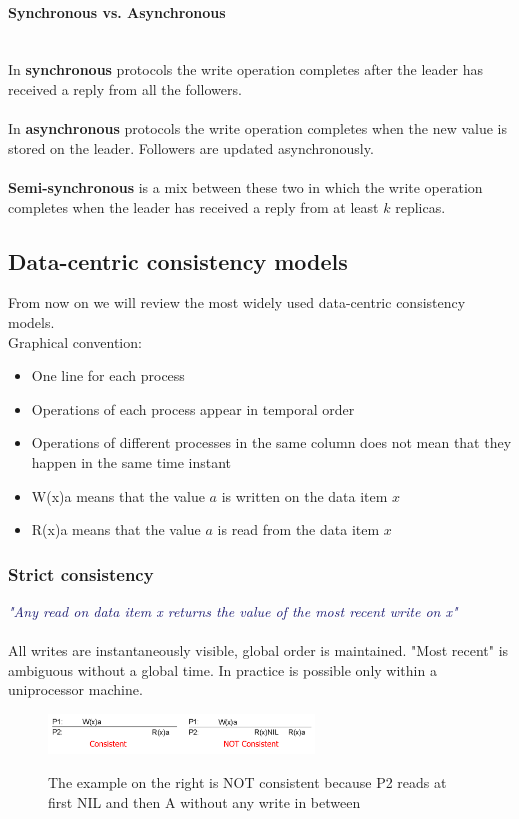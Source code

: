 \documentclass[10pt,a4paper]{article}
\newcommand{\myparagraph}[1]{\paragraph{#1}\mbox{}\\[0.05in]}
\newcommand{\mydefinition}[1]{\textcolor{MidnightBlue}{\textit{"#1"}\\ \\}}
\begin{document}
\myparagraph{Synchronous vs. Asynchronous}
In \textbf{synchronous} protocols the write operation completes after the leader has received a reply from all the followers. \\ \\
In \textbf{asynchronous} protocols the write operation completes when the new value is stored on the leader. Followers are updated asynchronously. \\ \\
\textbf{Semi-synchronous} is a mix between these two in which the write operation completes when the leader has received a reply from at least $k$ replicas.
\subsection{Data-centric consistency models}
From now on we will review the most widely used data-centric consistency models. \\
Graphical convention:
\begin{itemize}
	\item One line for each process
	\item Operations of each process appear in temporal order
	\item Operations of different processes in the same column does not mean that they happen in the same time instant
	\item W(x)a means that the value $a$ is written on the data item $x$
	\item R(x)a means that the value $a$ is read from the data item $x$
\end{itemize}
\subsubsection{Strict consistency}
\mydefinition{Any read on data item x returns the value of the most recent write on x} All writes are instantaneously visible, global order is maintained. "Most recent" is ambiguous without a global time. In practice is possible only within a uniprocessor machine.
\begin{figure}[h!]
 \hfill \includegraphics[width=200pt]{images/strict.png}\hspace*{\fill}
  \label{fig:strict}
  \caption{The example on the right is NOT consistent because P2 reads at first NIL and then A without any write in between}
\end{figure}
\end{document}

